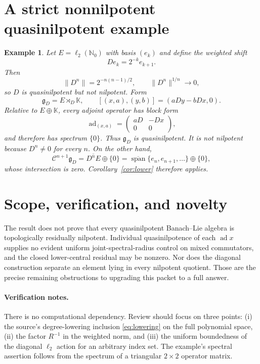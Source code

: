 \documentclass[11pt]{article}
\newtheorem{example}[theorem]{Example}
\theoremstyle{definition}
\theoremstyle{remark}
\newcommand{\K}{\mathbb K}
\newcommand{\g}{\mathfrak g}
\newcommand{\Cen}{\mathcal C}
\newcommand{\norm}[1]{\lVert #1\rVert}
\newcommand{\ad}{\operatorname{ad}}
\begin{document}
\section{A strict nonnilpotent quasinilpotent example}

\begin{example}
Let $E=\ell_2(\mathbb N_0)$ with basis $(e_k)$ and define the weighted shift
\[
 De_k=2^{-k}e_{k+1}.
\]
Then
\[
 \norm{D^n}=2^{-n(n-1)/2},
 \qquad \norm{D^n}^{1/n}\longrightarrow0,
\]
so $D$ is quasinilpotent but not nilpotent. Form
\[
 \g_D=E\rtimes_D\K,\qquad
 [(x,a),(y,b)]=(aDy-bDx,0).
\]
Relative to $E\oplus\K$, every adjoint operator has block form
\[
 \ad_{(x,a)}=
 \begin{pmatrix}
   aD&-Dx\\
   0&0
 \end{pmatrix},
\]
and therefore has spectrum $\{0\}$. Thus $\g_D$ is quasinilpotent. It is
not nilpotent because $D^n\ne0$ for every $n$. On the other hand,
\[
 \Cen^{n+1}\g_D=\overline{D^nE}\oplus\{0\}
 =\overline{\operatorname{span}}\{e_n,e_{n+1},\ldots\}\oplus\{0\},
\]
whose intersection is zero. Corollary~\ref{cor:lower} therefore applies.
\end{example}

\section{Scope, verification, and novelty}

The result does not prove that every quasinilpotent Banach--Lie algebra is
topologically residually nilpotent. Individual quasinilpotence of each
$\ad x$ supplies no evident uniform joint-spectral-radius control on mixed
commutators, and the closed lower-central residual may be nonzero. Nor does
the diagonal construction separate an element lying in every nilpotent
quotient. Those are the precise remaining obstructions to upgrading this
packet to a full answer.

\paragraph{Verification notes.}
There is no computational dependency. Review should focus on three points:
(i) the source's degree-lowering inclusion \eqref{eq:lowering} on the full
polynomial space, (ii) the factor $R^{-1}$ in the weighted norm, and (iii) the
uniform boundedness of the diagonal $\ell_2$ action for an arbitrary index
set. The example's spectral assertion follows from the spectrum of a
triangular $2\times2$ operator matrix.
\end{document}
